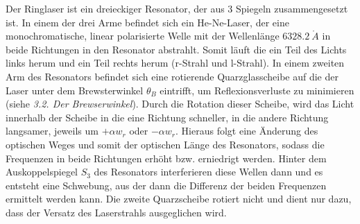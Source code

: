 Der Ringlaser ist ein dreieckiger Resonator, der aus 3 Spiegeln zusammengesetzt ist. In einem der drei Arme befindet sich ein He-Ne-Laser, der eine monochromatische, linear polarisierte Welle mit der Wellenlänge $6328.2 \ \mathring A$ in beide Richtungen in den Resonator abstrahlt. Somit läuft die ein Teil des Lichts links herum und ein Teil rechts herum (r-Strahl und l-Strahl). In einem zweiten Arm des Resonators befindet sich eine rotierende Quarzglasscheibe auf die der Laser unter dem Brewsterwinkel $\theta_B$ eintrifft, um Reflexionsverluste zu minimieren (siehe \emph{3.2. Der Brewserwinkel}). Durch die Rotation dieser Scheibe, wird das Licht innerhalb der Scheibe in die eine Richtung schneller, in die andere Richtung langsamer, jeweils um $+\alpha w_r$ oder $-\alpha w_r$. Hieraus folgt eine Änderung des optischen Weges und somit der optischen Länge des Resonators, sodass die Frequenzen in beide Richtungen erhöht bzw. erniedrigt werden. Hinter dem Auskoppelspiegel $S_3$ des Resonators interferieren diese Wellen dann und es entsteht eine Schwebung, aus der dann die Differenz der beiden Frequenzen ermittelt werden kann. Die zweite Quarzscheibe rotiert nicht und dient nur dazu, dass der Versatz des Laserstrahls ausgeglichen wird.